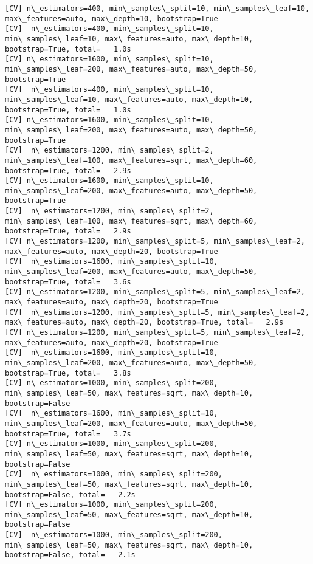 \documentclass[11pt]{article}
\begin{document}
\begin{Verbatim}[commandchars=\\\{\}]
[CV] n\_estimators=400, min\_samples\_split=10, min\_samples\_leaf=10, max\_features=auto, max\_depth=10, bootstrap=True 
[CV]  n\_estimators=400, min\_samples\_split=10, min\_samples\_leaf=10, max\_features=auto, max\_depth=10, bootstrap=True, total=   1.0s
[CV] n\_estimators=1600, min\_samples\_split=10, min\_samples\_leaf=200, max\_features=auto, max\_depth=50, bootstrap=True 
[CV]  n\_estimators=400, min\_samples\_split=10, min\_samples\_leaf=10, max\_features=auto, max\_depth=10, bootstrap=True, total=   1.0s
[CV] n\_estimators=1600, min\_samples\_split=10, min\_samples\_leaf=200, max\_features=auto, max\_depth=50, bootstrap=True 
[CV]  n\_estimators=1200, min\_samples\_split=2, min\_samples\_leaf=100, max\_features=sqrt, max\_depth=60, bootstrap=True, total=   2.9s
[CV] n\_estimators=1600, min\_samples\_split=10, min\_samples\_leaf=200, max\_features=auto, max\_depth=50, bootstrap=True 
[CV]  n\_estimators=1200, min\_samples\_split=2, min\_samples\_leaf=100, max\_features=sqrt, max\_depth=60, bootstrap=True, total=   2.9s
[CV] n\_estimators=1200, min\_samples\_split=5, min\_samples\_leaf=2, max\_features=auto, max\_depth=20, bootstrap=True 
[CV]  n\_estimators=1600, min\_samples\_split=10, min\_samples\_leaf=200, max\_features=auto, max\_depth=50, bootstrap=True, total=   3.6s
[CV] n\_estimators=1200, min\_samples\_split=5, min\_samples\_leaf=2, max\_features=auto, max\_depth=20, bootstrap=True 
[CV]  n\_estimators=1200, min\_samples\_split=5, min\_samples\_leaf=2, max\_features=auto, max\_depth=20, bootstrap=True, total=   2.9s
[CV] n\_estimators=1200, min\_samples\_split=5, min\_samples\_leaf=2, max\_features=auto, max\_depth=20, bootstrap=True 
[CV]  n\_estimators=1600, min\_samples\_split=10, min\_samples\_leaf=200, max\_features=auto, max\_depth=50, bootstrap=True, total=   3.8s
[CV] n\_estimators=1000, min\_samples\_split=200, min\_samples\_leaf=50, max\_features=sqrt, max\_depth=10, bootstrap=False 
[CV]  n\_estimators=1600, min\_samples\_split=10, min\_samples\_leaf=200, max\_features=auto, max\_depth=50, bootstrap=True, total=   3.7s
[CV] n\_estimators=1000, min\_samples\_split=200, min\_samples\_leaf=50, max\_features=sqrt, max\_depth=10, bootstrap=False 
[CV]  n\_estimators=1000, min\_samples\_split=200, min\_samples\_leaf=50, max\_features=sqrt, max\_depth=10, bootstrap=False, total=   2.2s
[CV] n\_estimators=1000, min\_samples\_split=200, min\_samples\_leaf=50, max\_features=sqrt, max\_depth=10, bootstrap=False 
[CV]  n\_estimators=1000, min\_samples\_split=200, min\_samples\_leaf=50, max\_features=sqrt, max\_depth=10, bootstrap=False, total=   2.1s

\end{Verbatim}
\end{document}

